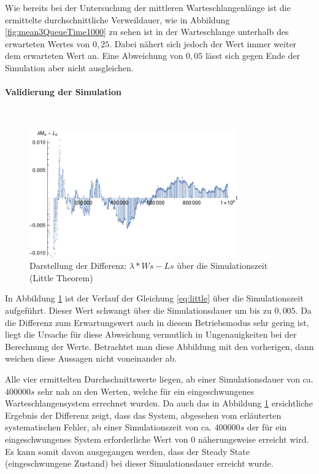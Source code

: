 Wie bereits bei der Untersuchung der mittleren Warteschlangenlänge ist die ermittelte durchschnittliche Verweildauer, wie in Abbildung \ref{fig:mean3QueueTime1000} zu sehen ist in der Warteschlange unterhalb des erwarteten Wertes von $0,25$. Dabei nähert sich jedoch der Wert immer weiter dem erwarteten Wert an. Eine Abweichung von $0,05$ lässt sich gegen Ende der Simulation aber nicht ausgleichen.

\paragraph{Validierung der Simulation}
\\
\begin{figure}[htpb]
	\centering
	\includegraphics[width=0.8\textwidth]{abbildungen/2_Phone_VIP/Arrival_1000_Serve_100_dur_1000000_Skip_0/LittleSystem.pdf}
	\caption{Darstellung der Differenz: $\lambda * Ws - Ls$ über die Simulationszeit (Little Theorem)}
	\label{fig:Little3System1000}
\end{figure} 

In Abbildung \ref{fig:Little3System1000} ist der Verlauf der Gleichung \ref{eq:little} über die Simulationszeit aufgeführt. 
Dieser Wert schwangt über die Simulationsdauer um bis zu $0,005$. Da die Differenz zum Erwartungswert auch in diesem Betriebsmodus sehr gering ist, liegt die Ursache für diese Abweichung vermutlich in Ungenauigkeiten bei der Berechnung der Werte. Betrachtet man diese Abbildung mit den vorherigen, dann weichen diese Aussagen nicht voneinander ab.

Alle vier ermittelten Durchschnittswerte liegen, ab einer Simulationsdauer von ca. $400000s$ sehr nah an den Werten, welche für ein eingeschwungenes Warteschlangensystem errechnet wurden. Da auch das in Abbildung  \ref{fig:Little3System1000} ersichtliche Ergebnis der Differenz zeigt, dass das System, abgesehen vom erläuterten systematischen Fehler, ab einer Simulationszeit von ca. $400000s$ der für ein eingeschwungenes System erforderliche Wert von $0$ näherungsweise erreicht wird. Es kann somit davon ausgegangen werden, dass der Steady State (eingeschwungene Zustand) bei dieser Simulationsdauer erreicht wurde.

